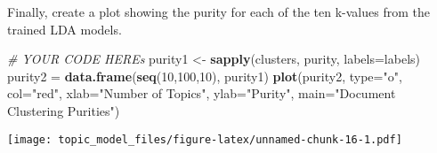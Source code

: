 \documentclass[]{article}
\newenvironment{Shaded}{\begin{snugshade}}{\end{snugshade}}
\newcommand{\CommentTok}[1]{\textcolor[rgb]{0.56,0.35,0.01}{\textit{#1}}}
\newcommand{\DataTypeTok}[1]{\textcolor[rgb]{0.13,0.29,0.53}{#1}}
\newcommand{\DecValTok}[1]{\textcolor[rgb]{0.00,0.00,0.81}{#1}}
\newcommand{\KeywordTok}[1]{\textcolor[rgb]{0.13,0.29,0.53}{\textbf{#1}}}
\newcommand{\NormalTok}[1]{#1}
\newcommand{\StringTok}[1]{\textcolor[rgb]{0.31,0.60,0.02}{#1}}
\begin{document}
Finally, create a plot showing the purity for each of the ten k-values
from the trained LDA models.

\begin{Shaded}
\begin{Highlighting}[]
\CommentTok{# YOUR CODE HEREs}
\NormalTok{purity1 <-}\StringTok{ }\KeywordTok{sapply}\NormalTok{(clusters, purity, }\DataTypeTok{labels=}\NormalTok{labels)}
\NormalTok{purity2 =}\StringTok{ }\KeywordTok{data.frame}\NormalTok{(}\KeywordTok{seq}\NormalTok{(}\DecValTok{10}\NormalTok{,}\DecValTok{100}\NormalTok{,}\DecValTok{10}\NormalTok{), purity1)}
\KeywordTok{plot}\NormalTok{(purity2, }\DataTypeTok{type=}\StringTok{"o"}\NormalTok{, }\DataTypeTok{col=}\StringTok{"red"}\NormalTok{, }\DataTypeTok{xlab=}\StringTok{"Number of Topics"}\NormalTok{, }\DataTypeTok{ylab=}\StringTok{"Purity"}\NormalTok{, }\DataTypeTok{main=}\StringTok{"Document Clustering Purities"}\NormalTok{)}
\end{Highlighting}
\end{Shaded}

\texttt{[image: topic\_model\_files/figure-latex/unnamed-chunk-16-1.pdf]}
\end{document}
